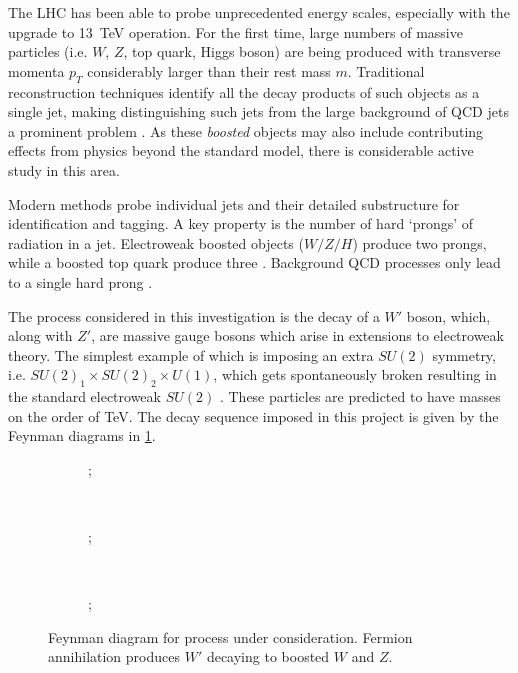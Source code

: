 \documentclass[twocolumn,twoside]{article}
\begin{document}
The LHC has been able to probe unprecedented energy scales, especially with the upgrade to \SI{13}{\tera\electronvolt} operation. For the first time, large numbers of massive particles (i.e. $W$, $Z$, top quark, Higgs boson) are being produced with transverse momenta $p_T$ considerably larger than their rest mass $m$. Traditional reconstruction techniques identify all the decay products of such objects as a single jet, making distinguishing such jets from the large background of QCD jets a prominent problem \cite{BOOST}. As these \textit{boosted} objects may also include contributing effects from physics beyond the standard model, there is considerable active study in this area.

Modern methods probe individual jets and their detailed substructure for identification and tagging. A key property is the number of hard `prongs' of radiation in a jet. Electroweak boosted objects ($W/Z/H$) produce two prongs, while a boosted top quark produce three \cite{nsubjettiness}. Background QCD processes only lead to a single hard prong \cite{prongs}.

The process considered in this investigation is the decay of a $W'$ boson, which, along with $Z'$, are massive gauge bosons which arise in extensions to electroweak theory. The simplest example of which is imposing an extra $SU(2)$ symmetry, i.e. $SU(2)_1 \times SU(2)_2 \times U(1)$, which gets spontaneously broken resulting in the standard electroweak $SU(2)$ \cite{pdg2012}. These particles are predicted to have masses on the order of \si{\tera\electronvolt}. The decay sequence imposed in this project is given by the Feynman diagrams in \cref{fig:feynmans}.


	\begin{figure}[H]
		\centering
		\begin{subfigure}[t]{0.3\linewidth}
			\centering
			;
		\end{subfigure}%
		~ 
		\begin{subfigure}[t]{0.3\linewidth}
			\centering
			;
		\end{subfigure}
		~
		\begin{subfigure}[t]{0.3\linewidth}
			\centering
			;
		\end{subfigure}
	\caption{Feynman diagram for process under consideration. Fermion annihilation produces $W'$ decaying to boosted $W$ and $Z$.}
	\label{fig:feynmans}
	\end{figure}
\end{document}
